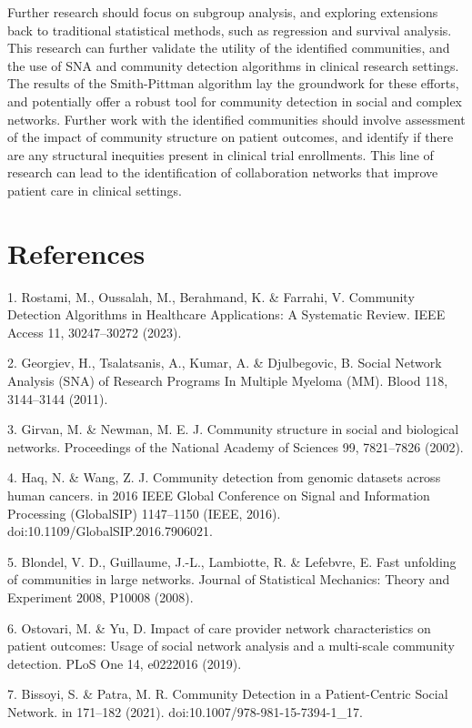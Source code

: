 \documentclass{article}
\begin{document}
Further research should focus on subgroup analysis, and exploring
extensions back to traditional statistical methods, such as regression
and survival analysis. This research can further validate the utility of
the identified communities, and the use of SNA and community detection
algorithms in clinical research settings. The results of the
Smith-Pittman algorithm lay the groundwork for these efforts, and
potentially offer a robust tool for community detection in social and
complex networks. Further work with the identified communities should
involve assessment of the impact of community structure on patient
outcomes, and identify if there are any structural inequities present in
clinical trial enrollments. This line of research can lead to the
identification of collaboration networks that improve patient care in
clinical settings.

\newpage
\section{References}\label{references}

1. Rostami, M., Oussalah, M., Berahmand, K. \& Farrahi, V. Community
Detection Algorithms in Healthcare Applications: A Systematic Review.
IEEE Access 11, 30247--30272 (2023).

2. Georgiev, H., Tsalatsanis, A., Kumar, A. \& Djulbegovic, B. Social
Network Analysis (SNA) of Research Programs In Multiple Myeloma (MM).
Blood 118, 3144--3144 (2011).

3. Girvan, M. \& Newman, M. E. J. Community structure in social and
biological networks. Proceedings of the National Academy of Sciences 99,
7821--7826 (2002).

4. Haq, N. \& Wang, Z. J. Community detection from genomic datasets
across human cancers. in 2016 IEEE Global Conference on Signal and
Information Processing (GlobalSIP) 1147--1150 (IEEE, 2016).
doi:10.1109/GlobalSIP.2016.7906021.

5. Blondel, V. D., Guillaume, J.-L., Lambiotte, R. \& Lefebvre, E. Fast
unfolding of communities in large networks. Journal of Statistical
Mechanics: Theory and Experiment 2008, P10008 (2008).

6. Ostovari, M. \& Yu, D. Impact of care provider network
characteristics on patient outcomes: Usage of social network analysis
and a multi-scale community detection. PLoS One 14, e0222016 (2019).

7. Bissoyi, S. \& Patra, M. R. Community Detection in a Patient-Centric
Social Network. in 171--182 (2021). doi:10.1007/978-981-15-7394-1\_17.
\end{document}
